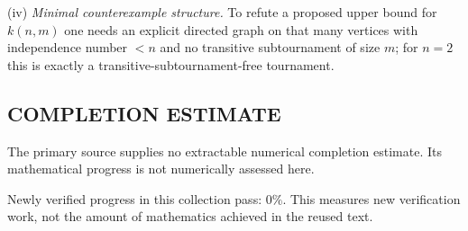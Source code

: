 (iv) \emph{Minimal counterexample structure.}
To refute a proposed upper bound for $k(n,m)$ one needs an explicit directed graph on that many vertices with independence number $<n$ and no transitive subtournament of size $m$; for $n=2$ this is exactly a transitive-subtournament-free tournament.




\subsection*{COMPLETION ESTIMATE}
The primary source supplies no extractable numerical completion estimate. Its mathematical progress is not numerically assessed here.

Newly verified progress in this collection pass: $0\%$. This measures new verification work, not the amount of mathematics achieved in the reused text.
